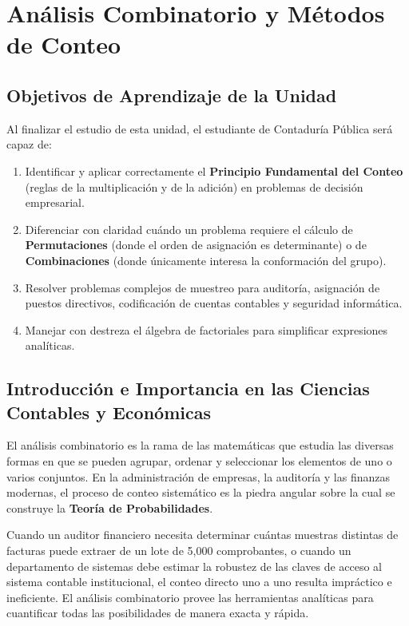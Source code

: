 \chapter{Análisis Combinatorio y Métodos de Conteo}
\label{cap:analisis_combinatorio}

\section*{Objetivos de Aprendizaje de la Unidad}
Al finalizar el estudio de esta unidad, el estudiante de Contaduría Pública será capaz de:
\begin{enumerate}
    \item Identificar y aplicar correctamente el \textbf{Principio Fundamental del Conteo} (reglas de la multiplicación y de la adición) en problemas de decisión empresarial.
    \item Diferenciar con claridad cuándo un problema requiere el cálculo de \textbf{Permutaciones} (donde el orden de asignación es determinante) o de \textbf{Combinaciones} (donde únicamente interesa la conformación del grupo).
    \item Resolver problemas complejos de muestreo para auditoría, asignación de puestos directivos, codificación de cuentas contables y seguridad informática.
    \item Manejar con destreza el álgebra de factoriales para simplificar expresiones analíticas.
\end{enumerate}

\section{Introducción e Importancia en las Ciencias Contables y Económicas}
El análisis combinatorio es la rama de las matemáticas que estudia las diversas formas en que se pueden agrupar, ordenar y seleccionar los elementos de uno o varios conjuntos. En la administración de empresas, la auditoría y las finanzas modernas, el proceso de conteo sistemático es la piedra angular sobre la cual se construye la \textbf{Teoría de Probabilidades}.

Cuando un auditor financiero necesita determinar cuántas muestras distintas de facturas puede extraer de un lote de 5,000 comprobantes, o cuando un departamento de sistemas debe estimar la robustez de las claves de acceso al sistema contable institucional, el conteo directo uno a uno resulta impráctico e ineficiente. El análisis combinatorio provee las herramientas analíticas para cuantificar todas las posibilidades de manera exacta y rápida.

